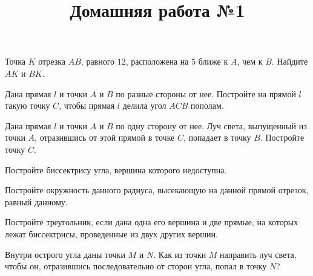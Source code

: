 \title{Домашняя работа №1}
\begin{listofex}
	
	\item Точка \( K \) отрезка \( AB \), равного \( 12 \), расположена на \( 5 \) ближе к \( A \), чем к \( B \). Найдите \( AK \) и \( BK \).
	
	\item {}
	
	\item Дана прямая \( l \) и точки \( A \) и \( B \) по разные стороны от нее.
	Постройте на прямой \( l \) такую точку \( C \), чтобы прямая \( l \) делила
	угол \( ACB \) пополам.
	
	\item Дана прямая \( l \) и точки \( A \) и \( B \) по одну сторону от нее.
	Луч света, выпущенный из точки \( A \), отразившись от этой прямой в точке \( C \), попадает в точку \( B \). Постройте точку \( C \).
	
	\item Постройте биссектрису угла, вершина которого недоступна.
	\item {}
	\item {}
	\item {}
	\item {}
	
	\item Постройте окружность данного радиуса, высекающую на данной прямой отрезок, равный данному.
	
	\item Постройте треугольник, если дана одна его вершина и две прямые, на которых лежат биссектрисы, проведенные из двух других вершин.
	
	\item Внутри острого угла даны точки \( M \) и \( N \). Как из точки \( M \) направить луч света, чтобы он, отразившись последовательно от сторон угла, попал в точку \( N \)?
	
\end{listofex}
